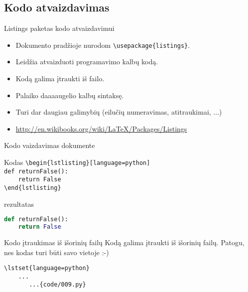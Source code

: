 \documentclass[11pt,a4paper]{beamer}
\begin{document}
\subsection{Kodo atvaizdavimas}
\begin{frame}[fragile]{Listings paketas kodo atvaizdavimui}
    \begin{itemize}
        \item Dokumento pradžioje nurodom \verb|\usepackage{listings}|.
        \item Leidžia atvaizduoti programavimo kalbų kodą.
        \item Kodą galima įtraukti iš failo.
        \item Palaiko daaaaugelio kalbų sintaksę.
        \item Turi dar daugiau galimybių (eilučių numeravimas, atitraukimai, ...)
        \item \href{http://en.wikibooks.org/wiki/LaTeX/Packages/Listings
}{http://en.wikibooks.org/wiki/LaTeX/Packages/Listings}
    \end{itemize}
\end{frame}

\begin{frame}[fragile]{Kodo vaizdavimas dokumente}
	\begin{block}{Kodas}
\verb|\begin{lstlisting}[language=python]|\\
\verb|def returnFalse():|\\
\verb|    return False|\\
\verb|\end{lstlisting}|
	\end{block}
	\begin{block}{rezultatas}
    \begin{lstlisting}[language=python]
def returnFalse():
    return False
    \end{lstlisting}
	\end{block}
\end{frame}
\begin{frame}[fragile]{Kodo įtraukimas iš išorinių failų}
    Kodą galima įtraukti iš išorinių failų. Patogu, nes kodas turi būti savo vietoje :-)
    \begin{lstlisting}
\lstset{language=python}
    ...
       ...{code/009.py}
    \end{lstlisting}
    \pause
    \lstset{language=python}
        
\end{frame}
\end{document}
